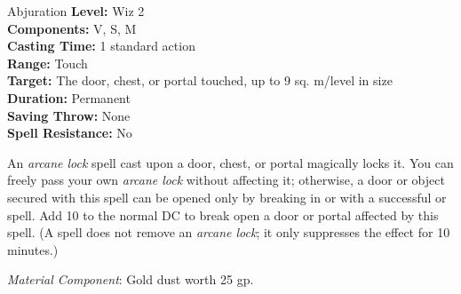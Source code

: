 {Abjuration}
{
	\textbf{Level:}
	Wiz 2\\
	\textbf{Components:}
	V, S, M\\
	\textbf{Casting Time:}
	1 standard action\\
	\textbf{Range:}
	Touch\\
	\textbf{Target:}
	The door, chest, or portal touched, up to 9 sq. m/level in size\\
	\textbf{Duration:}
	Permanent\\
	\textbf{Saving Throw:}
	None\\
	\textbf{Spell Resistance:}
	No\\
}
{
	An \emph{arcane lock} spell cast upon a door, chest, or portal magically locks it. You can freely pass your own \emph{arcane lock} without affecting it; otherwise, a door or object secured with this spell can be opened only by breaking in or with a successful  or  spell. Add 10 to the normal DC to break open a door or portal affected by this spell. (A  spell does not remove an \emph{arcane lock}; it only suppresses the effect for 10 minutes.)

	\textit{Material Component}:
	Gold dust worth 25 gp.

}

